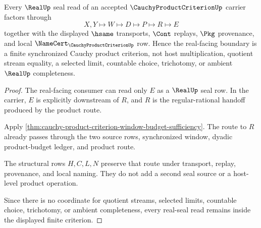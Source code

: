 \begin{theorem}
\label{thm:cauchy-product-criterion-real-seal-boundary}
Every $\RealUp$ seal read of an accepted $\CauchyProductCriterionUp$ carrier factors through
$$
X,Y\longmapsto W\longmapsto D\longmapsto P\longmapsto R\longmapsto E
$$
together with the displayed $\hsame$ transports, $\Cont$ replays, $\Pkg$ provenance, and local $\NameCert_{\CauchyProductCriterionUp}$ row. Hence the real-facing boundary is a finite synchronized Cauchy product criterion, not host multiplication, quotient stream equality, a selected limit, countable choice, trichotomy, or ambient $\RealUp$ completeness.
\end{theorem}
\begin{proof}
The real-facing consumer can read only $E$ as a $\RealUp$ seal row. In the carrier, $E$ is explicitly downstream of $R$, and $R$ is the regular-rational handoff produced by the product route.

Apply \autoref{thm:cauchy-product-criterion-window-budget-sufficiency}. The route to $R$ already passes through the two source rows, synchronized window, dyadic product-budget ledger, and product route.

The structural rows $H,C,L,N$ preserve that route under transport, replay, provenance, and local naming. They do not add a second seal source or a host-level product operation.

Since there is no coordinate for quotient streams, selected limits, countable choice, trichotomy, or ambient completeness, every real-seal read remains inside the displayed finite criterion.
\end{proof}


